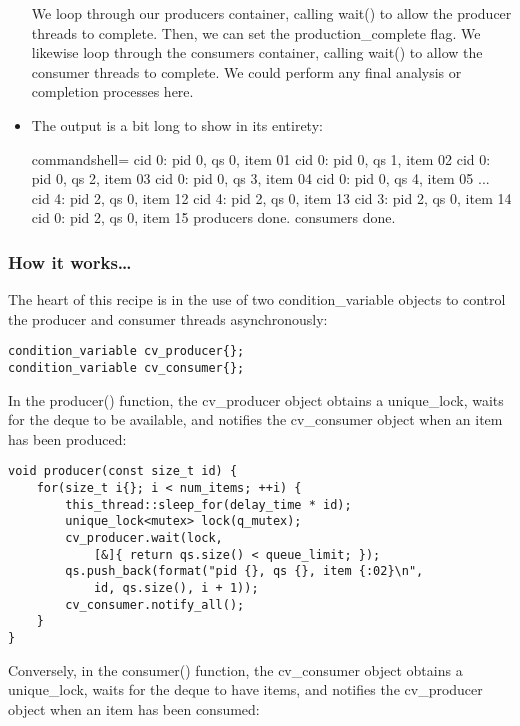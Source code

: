 \begin{itemize}
We loop through our producers container, calling wait() to allow the producer threads to complete. Then, we can set the production\_complete flag. We likewise loop through the consumers container, calling wait() to allow the consumer threads to complete. We could perform any final analysis or completion processes here.

\item 
The output is a bit long to show in its entirety:

\begin{tcblisting}{commandshell={}}
cid 0: pid 0, qs 0, item 01
cid 0: pid 0, qs 1, item 02
cid 0: pid 0, qs 2, item 03
cid 0: pid 0, qs 3, item 04
cid 0: pid 0, qs 4, item 05
...
cid 4: pid 2, qs 0, item 12
cid 4: pid 2, qs 0, item 13
cid 3: pid 2, qs 0, item 14
cid 0: pid 2, qs 0, item 15
producers done.
consumers done.
\end{tcblisting}

\end{itemize}


\subsubsection{How it works…}

The heart of this recipe is in the use of two condition\_variable objects to control the producer and consumer threads asynchronously:

\begin{lstlisting}[style=styleCXX]
condition_variable cv_producer{};
condition_variable cv_consumer{};
\end{lstlisting}

In the producer() function, the cv\_producer object obtains a unique\_lock, waits for the deque to be available, and notifies the cv\_consumer object when an item has been produced:

\begin{lstlisting}[style=styleCXX]
void producer(const size_t id) {
	for(size_t i{}; i < num_items; ++i) {
		this_thread::sleep_for(delay_time * id);
		unique_lock<mutex> lock(q_mutex);
		cv_producer.wait(lock,
			[&]{ return qs.size() < queue_limit; });
		qs.push_back(format("pid {}, qs {}, item {:02}\n",
			id, qs.size(), i + 1));
		cv_consumer.notify_all();
	}
}
\end{lstlisting}

Conversely, in the consumer() function, the cv\_consumer object obtains a unique\_lock, waits for the deque to have items, and notifies the cv\_producer object when an item has been consumed:

